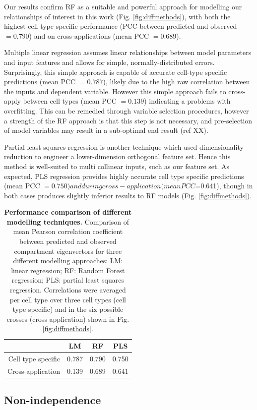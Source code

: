 \documentclass[a4paper,11pt,oneside]{book}
\begin{document}
Our results confirm RF as a suitable and powerful approach for modelling our relationships of interest in this work (Fig. \ref{fig:diffmethods}), with both the highest cell-type specific performance (PCC between predicted and observed $=0.790$) and on cross-applications (mean PCC $= 0.689$). 

Multiple linear regression assumes linear relationships between model parameters and input features and allows for simple, normally-distributed errors. Surprisingly, this simple approach is capable of accurate cell-type specific predictions (mean PCC $= 0.787$), likely due to the high raw correlation between the inputs and dependent variable. However this simple approach fails to cross-apply between cell types (mean PCC $=0.139$) indicating a problems with overfitting. This can be remedied through variable selection procedures, however a strength of the RF approach is that this step is not necessary, and pre-selection of model variables may result in a sub-optimal end result (ref XX).

Partial least squares regression is another technique which used dimensionality reduction to engineer a lower-dimension orthogonal feature set. Hence this method is well-suited to multi collinear inputs, such as our feature set. As expected, PLS regression provides highly accurate cell type specific predictions (mean PCC $=0.750) and during cross-application (mean PCC $=0.641), though in both cases produces slightly inferior results to RF models (Fig. \ref{fig:diffmethods}).

\begin{table}
\centering
\caption{ {\bf Performance comparison of different modelling techniques. }
 Comparison of mean Pearson correlation coefficient between predicted and observed compartment eigenvectors for three different modelling approaches: LM: linear regression; RF: Random Forest regression; PLS: partial least squares regression. Correlations were averaged per cell type over three cell types (cell type specific) and in the six possible crosses (cross-application) shown in Fig. \ref{fig:diffmethods}.
}
\label{tab:diffmethods}
\begin{tabular}{r|ccc}
& {\bf LM} & {\bf RF} & {\bf PLS} \\
\hline
Cell type specific  &  0.787 & 0.790 & 0.750 \\
Cross-application  & 0.139 & 0.689 & 0.641
\end{tabular}
\end{table}

\subsection{Non-independence}
\end{document}
